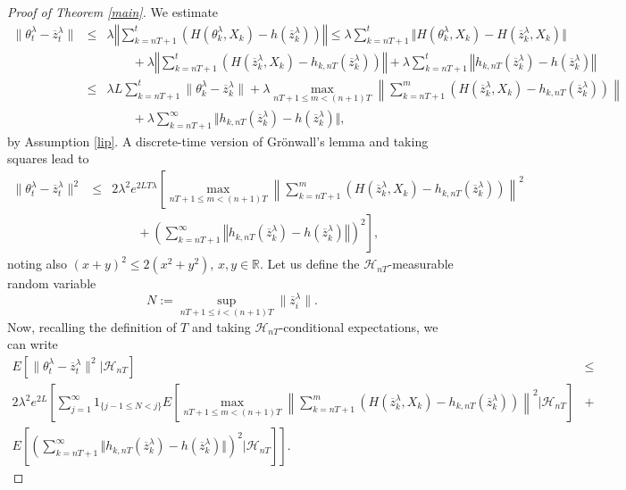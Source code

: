 \documentclass[a4paper]{article}
\begin{document}
\begin{proof}[ Proof of Theorem \ref{main}]
We estimate
\begin{eqnarray*}
\| \theta_{t}^{\lambda}-\overline{z}^{\lambda}_{t}\| &\leq& \lambda \left\Vert\sum_{k=nT+1}^t 	\left(H(\theta^{\lambda}_k,X_k)-h(\overline{z}^{\lambda}_k)\right)\right\Vert \leq
		\lambda \sum_{k=nT+1}^t \Vert
		H(\theta^{\lambda}_k,X_k)-H(\overline{z}^{\lambda}_k,X_k)\Vert \\
		&& \qquad+
		\lambda \left\Vert\sum_{k=nT+1}^{t}
		\left(H(\overline{z}^{\lambda}_k,X_k)-h_{k,nT}(\overline{z}^{\lambda}_k)\right) \right\Vert +
		\lambda \sum_{k=nT+1}^t
		\left\Vert h_{k,nT}(\overline{z}^{\lambda}_k)- h(\overline{z}^{\lambda}_k)\right\Vert \\
&\leq&	\lambda L \sum_{k=nT+1}^t \|\theta^{\lambda}_k-\overline{z}^{\lambda}_k\| + 		\lambda
		\max_{nT+1\leq m< (n+1)T} \left\|\sum_{k=nT+1}^m \left(H(\overline{z}_k^{\lambda},X_k)-
		h_{k,nT}(\overline{z}^{\lambda}_k)\right)\right\|\\
		&& \qquad + 		\lambda \sum_{k=nT+1}^{\infty} \Vert h_{k,nT}(\overline{z}_k^{\lambda})- h(\overline{z}_k^{\lambda})\Vert,
	\end{eqnarray*}
	by Assumption \ref{lip}.
A discrete-time version of Gr\"onwall's lemma and taking squares lead to
	\begin{eqnarray*}
		\|\theta^{\lambda}_{t}-\overline{z}_{t}^{\lambda}\|^2 &\leq&
		2\lambda^2 e^{2LT\lambda}
		\left[\max_{nT+1\leq m< (n+1)T} \left\|\sum_{k=nT+1}^m \left(H(\overline{z}_k^{\lambda},X_k)-
		h_{k,nT}(\overline{z}^{\lambda}_k)\right)\right\|^2 \right.\\
		&& \qquad +
		\left. \left(\sum_{k=nT+1}^{\infty} \left\Vert h_{k,nT}(\overline{z}_k^{\lambda})- h(\overline{z}_k^{\lambda})\right\Vert\right)^2\right],
	\end{eqnarray*}
	noting also $(x+y)^2\leq 2(x^2+y^2)$, $x,y\in\mathbb{R}$.
	Let us define the $\mathcal{H}_{nT}$-measurable random variable
	$$
	N:=\sup_{nT+1\leq i< (n+1)T}\|\overline{z}_i^{\lambda}\|.
	$$
	Now, recalling the definition of $T$ and taking $\mathcal{H}_{nT}$-conditional expectations, we can write
\begin{eqnarray*}
	E\left[\|\theta^{\lambda}_{t}-\overline{z}_{t}^{\lambda}\|^2\vert\mathcal{H}_{nT}\right]
	&\leq& \\
	2\lambda^2 e^{2L} \left[\sum_{j=1}^{\infty}1_{\{j-1\leq N <j\}}
	E\left[\max_{nT+1\leq m<(n+1)T} \left\|\sum_{k=nT+1}^m \left(H(\overline{z}_k^{\lambda},X_k)-
	h_{k,nT}(\overline{z}_k^{\lambda})\right)\right\|^2 \vert\mathcal{H}_{nT}\right]\right. &+&  \\
	\left. E\left[\left(\sum_{k=nT+1}^{\infty} \Vert h_{k,nT}(\overline{z}_k^{\lambda})-
	h(\overline{z}_k^{\lambda})\Vert\right)^2\vert\mathcal{H}_{nT}\right]
	\right].
\end{eqnarray*}
	

\end{proof}
\end{document}
